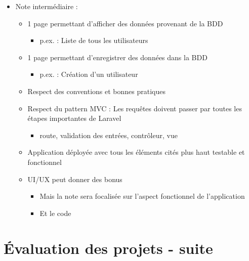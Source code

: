 \begin{itemize}
\tightlist
\item
  Note intermédiaire :

  \begin{itemize}
  \tightlist
  \item
    1 page permettant d'afficher des données provenant de la BDD

    \begin{itemize}
    \tightlist
    \item
      p.ex. : Liste de tous les utilisateurs
    \end{itemize}
  \item
    1 page permettant d'enregistrer des données dans la BDD

    \begin{itemize}
    \tightlist
    \item
      p.ex. : Création d'un utilisateur
    \end{itemize}
  \item
    Respect des conventions et bonnes pratiques
  \item
    Respect du pattern MVC : Les requêtes doivent passer par toutes les
    étapes importantes de Laravel

    \begin{itemize}
    \tightlist
    \item
      route, validation des entrées, contrôleur, vue
    \end{itemize}
  \item
    Application déployée avec tous les éléments cités plus haut testable
    et fonctionnel
  \item
    UI/UX peut donner des bonus

    \begin{itemize}
    \tightlist
    \item
      Mais la note sera focalisée sur l'aspect fonctionnel de
      l'application
    \item
      Et le code
    \end{itemize}
  \end{itemize}
\end{itemize}

\hypertarget{uxe9valuation-des-projets---suite}{%
\section{Évaluation des projets -
suite}\label{uxe9valuation-des-projets---suite}}


